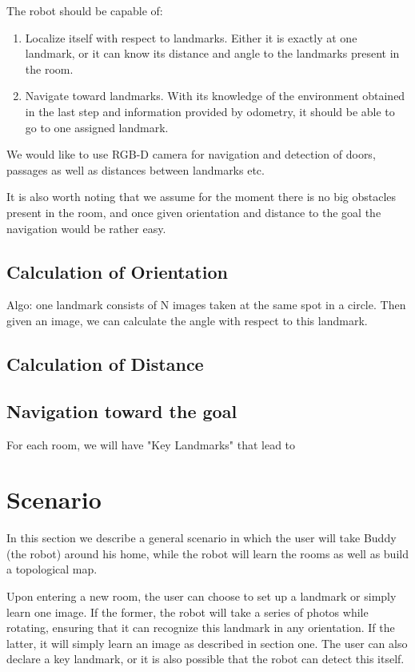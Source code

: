 \documentclass[a4paper]{scrartcl}
\begin{document}
The robot should be capable of:
\begin{enumerate}
\item Localize itself with respect to landmarks. Either it is exactly at one landmark, or it can know its distance and angle to the landmarks present in the room.
\item Navigate toward landmarks. With its knowledge of the environment obtained in the last step and information provided by odometry, it should be able to go to one assigned landmark. 
\end{enumerate}

We would like to use RGB-D camera for navigation and detection of doors, passages as well as distances between landmarks etc.

It is also worth noting that we assume for the moment there is no big obstacles present in the room, and once given orientation and distance to the goal the navigation would be rather easy. 

\subsection{Calculation of Orientation}
Algo: one landmark consists of N images taken at the same spot in a circle. Then given an image, we can calculate the angle with respect to this landmark.

\subsection{Calculation of Distance}

\subsection{Navigation toward the goal}
For each room, we will have "Key Landmarks" that lead to    

\newpage
\section{Scenario}
In this section we describe a general scenario in which the user will take Buddy (the robot) around his home, while the robot will learn the rooms as well as build a topological map. 

Upon entering a new room, the user can choose to set up a landmark or simply learn one image. If the former, the robot will take a series of photos while rotating, ensuring that it can recognize this landmark in any orientation. If the latter, it will simply learn an image as described in section one. The user can also declare a key landmark, or it is also possible that the robot can detect this itself. 
\end{document}
